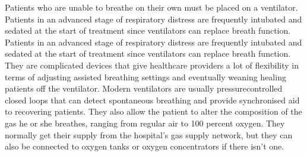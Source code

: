 \documentclass[12pt]{article}
\begin{document}
Patients who are unable to breathe on their own must be placed on a ventilator.
Patients in an advanced stage of respiratory distress are frequently intubated
and sedated at the start of treatment since ventilators can replace breath function.
Patients in an advanced stage of respiratory distress are frequently intubated and sedated at the start of treatment since ventilators can replace breath
function. They are complicated devices that give healthcare providers a lot of
flexibility in terms of adjusting assisted breathing settings and eventually weaning healing patients off the ventilator. Modern ventilators are usually pressurecontrolled closed loops that can detect spontaneous breathing and provide synchronised aid to recovering patients. They also allow the patient to alter the
composition of the gas he or she breathes, ranging from regular air to 100 percent
oxygen. They normally get their supply from the hospital’s gas supply network,
but they can also be connected to oxygen tanks or oxygen concentrators if there
isn’t one.
\end{document}
